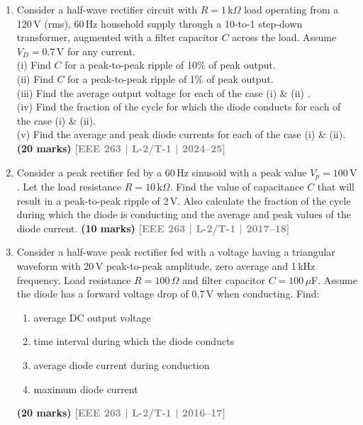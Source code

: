 \documentclass[12pt]{article}
\newcommand{\yr}[1]{\hfill\textcolor{gray}{\small\textbf{[#1]}}}
\newcommand{\mk}[1]{\textcolor{orange!70!black}{\small\textbf{(#1 marks)}}}
\begin{document}
\begin{enumerate}
    
\item Consider a half-wave rectifier circuit with $R=1\,\text{k}\Omega$ load operating from a 120\,V (rms), 60\,Hz household supply through a 10-to-1 step-down transformer, augmented with a filter capacitor $C$ across the load. Assume $V_D=0.7\,\text{V}$ for any current. \\
(i) Find $C$ for a peak-to-peak ripple of 10\% of peak output.\\
 (ii) Find $C$ for a peak-to-peak ripple of 1\% of peak output. \\
 (iii) Find the average output voltage for each of the case (i) \& (ii) . \\
 (iv) Find the fraction of the cycle for which the diode conducts for each of the case (i) \& (ii).\\
 (v) Find the average and peak diode currents for each of the case (i) \& (ii).\\
\mk{20} \yr{EEE 263 | L-2/T-1 | 2024--25}


\item Consider a peak rectifier fed by a 60\,Hz sinusoid with a peak value $V_p=100\,\text{V}$. Let the load resistance $R=10\,\text{k}\Omega$. Find the value of capacitance $C$ that will result in a peak-to-peak ripple of 2\,V. Also calculate the fraction of the cycle during which the diode is conducting and the average and peak values of the diode current.
\mk{10} \yr{EEE 263 | L-2/T-1 | 2017--18}


\item Consider a half-wave peak rectifier fed with a voltage having a triangular waveform with 20\,V peak-to-peak amplitude, zero average and 1\,kHz frequency. Load resistance $R=100\,\Omega$ and filter capacitor $C=100\,\mu$F. Assume the diode has a forward voltage drop of 0.7\,V when conducting. Find:
\begin{enumerate}
    \item average DC output voltage
    \item time interval during which the diode conducts
    \item average diode current during conduction
    \item maximum diode current
\end{enumerate}
\mk{20} \yr{EEE 263 | L-2/T-1 | 2016--17}



\end{enumerate}
\end{document}

